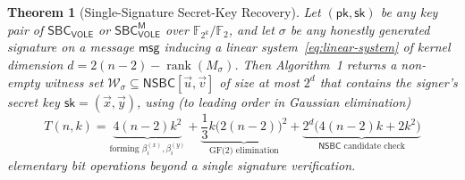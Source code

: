 \documentclass[11pt,a4paper]{article}
\newtheorem{theorem}{Theorem}
\theoremstyle{definition}
\theoremstyle{remark}
\newcommand{\Ftwo}{\mathbb{F}_2}
\newcommand{\Ftwok}{\mathbb{F}_{2^k}}
\newcommand{\NSBC}{\mathsf{NSBC}}
\newcommand{\SBCVOLE}{\mathsf{SBC}_{\mathsf{VOLE}}}
\newcommand{\SBCVOLEM}{\mathsf{SBC}_{\mathsf{VOLE}}^{\mathsf{M}}}
\newcommand{\pk}{\mathsf{pk}}
\newcommand{\sk}{\mathsf{sk}}
\newcommand{\msg}{\mathsf{msg}}
\newcommand{\rank}{\operatorname{rank}}
\begin{document}
\begin{theorem}[Single-Signature Secret-Key Recovery]
\label{thm:key-recovery}
Let $(\pk, \sk)$ be any key pair of $\SBCVOLE$ or $\SBCVOLEM$ over $\Ftwok / \Ftwo$, and let $\sigma$ be any honestly generated signature on a message $\msg$ inducing a linear system~\eqref{eq:linear-system} of kernel dimension $d = 2(n-2) - \rank(M_\sigma)$. Then Algorithm~1 returns a non-empty witness set $\mathcal{W}_\sigma \subseteq \NSBC[\vec{u}, \vec{v}]$ of size at most $2^d$ that contains the signer's secret key $\sk = (\vec{x}, \vec{y})$, using (to leading order in Gaussian elimination)
\begin{equation}
\label{eq:cost-formula}
T(n, k) = \underbrace{4(n-2) k^2}_{\text{forming } \beta_i^{(x)}, \beta_i^{(y)}} + \underbrace{\frac{1}{3} k \big(2(n-2)\big)^2}_{\text{GF(2) elimination}} + \underbrace{2^d \big(4(n-2)k + 2k^2\big)}_{\NSBC \text{ candidate check}}
\end{equation}
elementary bit operations beyond a single signature verification.
\end{theorem}
\end{document}
